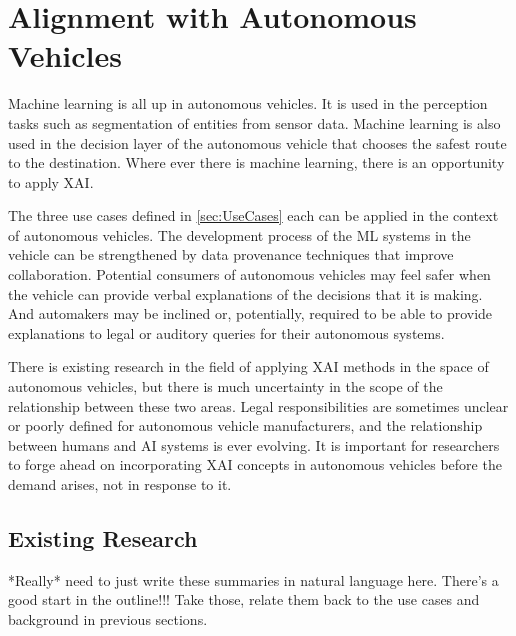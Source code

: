 \section{Alignment with Autonomous Vehicles}\label{sec:Alignment}

Machine learning is all up in autonomous vehicles.  It is used in the perception tasks such as segmentation of entities from sensor data.  Machine learning is also used in the decision layer of the autonomous vehicle that chooses the safest route to the destination.  Where ever there is machine learning, there is an opportunity to apply XAI.

The three use cases defined in \ref{sec:UseCases} each can be applied in the context of autonomous vehicles.  The development process of the ML systems in the vehicle can be strengthened by data provenance techniques that improve collaboration.  Potential consumers of autonomous vehicles may feel safer when the vehicle can provide verbal explanations of the decisions that it is making.  And automakers may be inclined or, potentially, required to be able to provide explanations to legal or auditory queries for their autonomous systems.

There is existing research in the field of applying XAI methods in the space of autonomous vehicles, but there is much uncertainty in the scope of the relationship between these two areas.  Legal responsibilities are sometimes unclear or poorly defined for autonomous vehicle manufacturers, and the relationship between humans and AI systems is ever evolving.  It is important for researchers to forge ahead on incorporating XAI concepts in autonomous vehicles before the demand arises, not in response to it.

\subsection{Existing Research}

*Really* need to just write these summaries in natural language here.  There's a good start in the outline!!!  Take those, relate them back to the use cases and background in previous sections.

